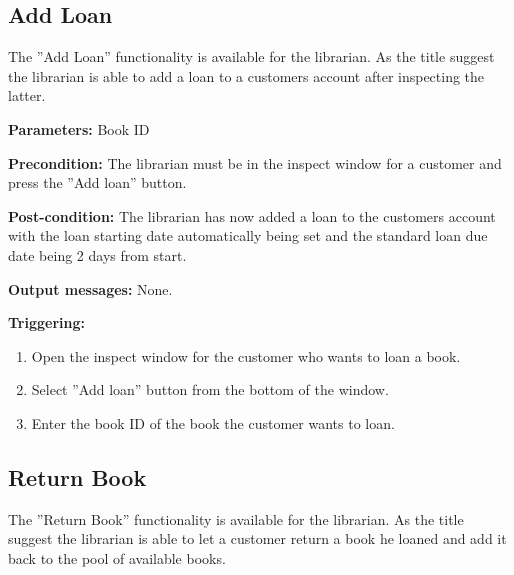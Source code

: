 \subsection{Add Loan}

The ''Add Loan'' functionality is available for the librarian. As the title
suggest the librarian is able to add a loan to a customers account after
inspecting the latter.

\begin{description}

\item \textbf{Parameters:} Book ID

\item \textbf{Precondition:} The librarian must be in the inspect window for a
customer and press the ''Add loan'' button.

\item \textbf{Post-condition:} The librarian has now added a loan to the
customers account with the loan starting date automatically being set and the
standard loan due date being 2 days from start.

\item \textbf{Output messages:} None.

\item \textbf{Triggering:}
\begin{enumerate}
\item Open the inspect window for the customer who wants to loan a book.
\item Select ''Add loan'' button from the bottom of the window.
\item Enter the book ID of the book the customer wants to loan.
\end{enumerate}

\end{description}

\subsection{Return Book}

The ''Return Book'' functionality is available for the librarian. As the title
suggest the librarian is able to let a customer return a book he loaned and add
it back to the pool of available books.

